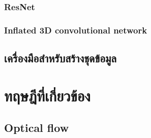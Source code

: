 \subsubsection{ResNet}


\clearpage
\subsubsection{Inflated 3D convolutional network}

\clearpage

\subsection{เครื่องมือสำหรับสร้างชุดข้อมูล}


\clearpage
%
%
%

\section{ทฤษฎีที่เกี่ยวข้อง}
\subsection{Optical flow}





